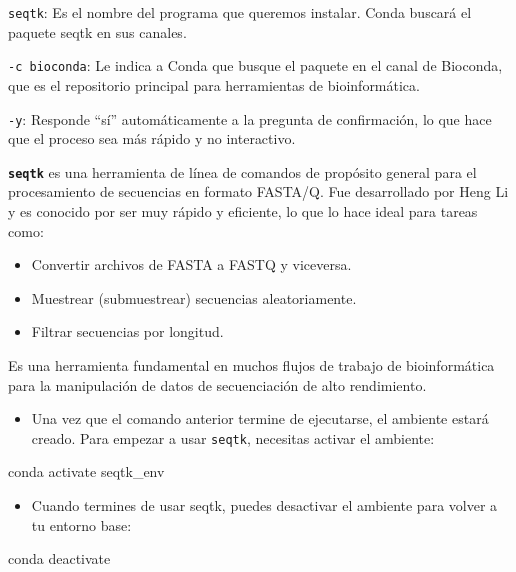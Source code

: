 \documentclass[
]{book}
\newenvironment{Shaded}{\begin{snugshade}}{\end{snugshade}}
\newcommand{\ExtensionTok}[1]{#1}
\newcommand{\NormalTok}[1]{#1}
\providecommand{\tightlist}{%
  \setlength{\itemsep}{0pt}\setlength{\parskip}{0pt}}
\begin{document}
\texttt{seqtk}: Es el nombre del programa que queremos instalar. Conda buscará el paquete seqtk en sus canales.

\texttt{-c\ bioconda}: Le indica a Conda que busque el paquete en el canal de Bioconda, que es el repositorio principal para herramientas de bioinformática.

\texttt{-y}: Responde ``sí'' automáticamente a la pregunta de confirmación, lo que hace que el proceso sea más rápido y no interactivo.

\textbf{\texttt{seqtk}} es una herramienta de línea de comandos de propósito general para el procesamiento de secuencias en formato FASTA/Q. Fue desarrollado por Heng Li y es conocido por ser muy rápido y eficiente, lo que lo hace ideal para tareas como:

\begin{itemize}
\item
  Convertir archivos de FASTA a FASTQ y viceversa.
\item
  Muestrear (submuestrear) secuencias aleatoriamente.
\item
  Filtrar secuencias por longitud.
\end{itemize}

Es una herramienta fundamental en muchos flujos de trabajo de bioinformática para la manipulación de datos de secuenciación de alto rendimiento.

\begin{itemize}
\tightlist
\item
  Una vez que el comando anterior termine de ejecutarse, el ambiente estará creado. Para empezar a usar \texttt{seqtk}, necesitas activar el ambiente:
\end{itemize}

\begin{Shaded}
\begin{Highlighting}[]
\ExtensionTok{conda}\NormalTok{ activate seqtk\_env}
\end{Highlighting}
\end{Shaded}

\begin{itemize}
\tightlist
\item
  Cuando termines de usar seqtk, puedes desactivar el ambiente para volver a tu entorno base:
\end{itemize}

\begin{Shaded}
\begin{Highlighting}[]
\ExtensionTok{conda}\NormalTok{ deactivate}
\end{Highlighting}
\end{Shaded}
\end{document}
